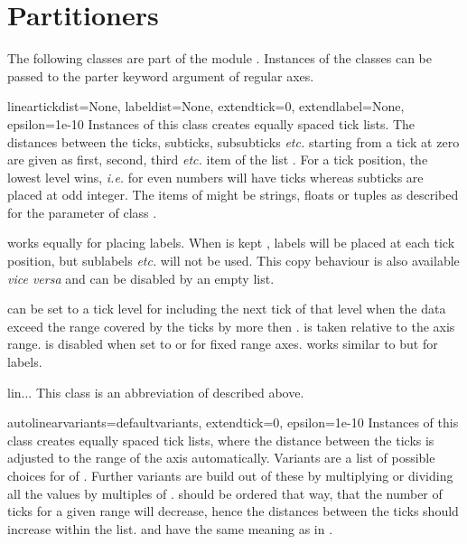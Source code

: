 \section{Partitioners}


The following classes are part of the module .
Instances of the classes can be passed to the parter keyword argument
of regular axes.

\begin{classdesc}{linear}{tickdist=None, labeldist=None,
                          extendtick=0, extendlabel=None,
                          epsilon=1e-10}
  Instances of this class creates equally spaced tick lists. The
  distances between the ticks, subticks, subsubticks \emph{etc.}
  starting from a tick at zero are given as first, second, third
  \emph{etc.} item of the list . For a tick position,
  the lowest level wins, \emph{i.e.} for \code{[2, 1]} even numbers
  will have ticks whereas subticks are placed at odd integer. The
  items of  might be strings, floats or tuples as
  described for the  parameter of class .

   works equally for placing labels. When
   is kept , labels will be placed at each
  tick position, but sublabels \emph{etc.} will not be used. This copy
  behaviour is also available \emph{vice versa} and can be disabled by
  an empty list.

   can be set to a tick level for including the next
  tick of that level when the data exceed the range covered by the
  ticks by more then .  is taken relative
  to the axis range.  is disabled when set to
   or for fixed range axes.  works similar
  to  but for labels.
\end{classdesc}

\begin{classdesc}{lin}{...}
This class is an abbreviation of  described above.
\end{classdesc}

\begin{classdesc}{autolinear}{variants=defaultvariants,
                              extendtick=0,
                              epsilon=1e-10}
  Instances of this class creates equally spaced tick lists, where the
  distance between the ticks is adjusted to the range of the axis
  automatically. Variants are a list of possible choices for
   of . Further variants are build out of
  these by multiplying or dividing all the values by multiples of
  .  should be ordered that way, that the
  number of ticks for a given range will decrease, hence the distances
  between the ticks should increase within the  list.
   and  have the same meaning as in
  .
\end{classdesc}

